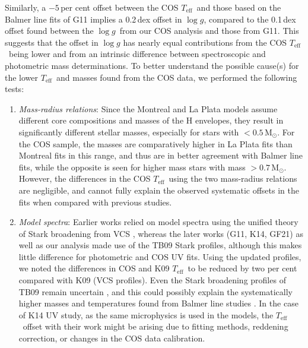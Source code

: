 \documentclass[fleqn,usenatbib, useAMS]{mnras}
\newcommand{\Teff}{\mbox{$T_{\mathrm{eff}}$}}
\newcommand{\logg}{\mbox{$\log g$}}
\newcommand{\Msun}{\mbox{$\mathrm{M_\odot}$}}
\begin{document}
Similarly, a $-5$\,per cent offset between the COS \Teff\ and those based on the Balmer line fits of  G11 implies a 0.2\,dex offset in \logg, compared to the 0.1\,dex offset found between the \logg\ from our  COS analysis and those from G11. This suggests that the offset in $\log g$ has nearly equal contributions from the COS \Teff\ being lower and from an intrinsic difference between spectroscopic and photometric mass determinations. To better understand the possible cause(s) for the lower \Teff\ and masses found from the COS data, we performed the following tests:
\begin{enumerate}

\item \textit{Mass-radius relations}: Since the Montreal and La Plata models assume different core compositions and masses of the H envelopes, they result in significantly different stellar masses, especially for stars with $<0.5\,\Msun$. For the COS sample, the masses are comparatively higher in La Plata fits than Montreal fits in this range, and thus are in better agreement with Balmer line fits, while the opposite is seen for higher mass stars with mass $>0.7\,\Msun$. However, the differences in the COS \Teff\ using the two mass-radius relations are negligible, and cannot fully explain the observed systematic offsets in the fits when compared with previous studies.\\

\item \textit{Model spectra}: Earlier works relied on model spectra \citep{Liebert2005, Lajoie2007, Koester2009} using the unified theory of Stark broadening from VCS \citep{vidal1973}, whereas the later works (G11, K14, GF21) as well as our analysis made use of the TB09 Stark profiles, although this makes little difference for photometric and COS UV fits. Using the updated profiles, we noted the differences in COS and K09 \Teff\ to be reduced by two per cent compared with K09 (VCS profiles). Even the Stark broadening profiles of TB09 remain uncertain \citep{Cho_2022}, and this could possibly explain the systematically higher masses and temperatures found from Balmer line studies \citep{Tremblay2019_param,genest2019}. In the case of K14 UV study, as the same microphysics is used in the models, the \Teff\ offset with their work might be arising due to fitting methods, reddening correction, or changes in the COS data calibration. \\
    

\end{enumerate}
\end{document}
